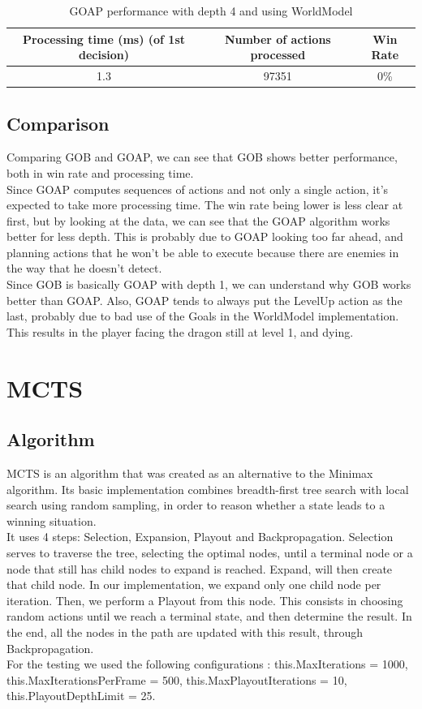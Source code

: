 \documentclass{article}
\begin{document}
  \begin{table}[h!]
    \centering
    \caption{GOAP performance with depth 4 and using WorldModel}
    \label{tab:tableGOAP6}
    \begin{tabular}{c|c|c}
      \textbf{Processing time (ms) (of 1st decision)} & \textbf{Number of actions processed} & \textbf{Win Rate}\\
      \hline
      1.3 & 97351 & 0\%
    \end{tabular}
  \end{table}
  \subsection{Comparison}
  Comparing GOB and GOAP, we can see that GOB shows better performance, both in win rate and processing time. \\
  Since GOAP computes sequences of actions and not only a single action, it's expected to take more processing time. The win rate being lower is less clear at first, but
  by looking at the data, we can see that the GOAP algorithm works better for less depth. This is probably due to GOAP looking too far ahead, and planning actions 
  that he won't be able to execute because there are enemies in the way that he doesn't detect. \\
  Since GOB is basically GOAP with depth 1, we can understand why GOB works better than GOAP. Also, GOAP tends to always put the LevelUp action as the last, probably due to
  bad use of the Goals in the WorldModel implementation. This results in the player facing the dragon still at level 1, and dying.
  
  \section{MCTS}
  \subsection{Algorithm}
  MCTS is an algorithm that was created as an alternative to the Minimax algorithm. Its basic implementation combines breadth-first tree search with local search using
  random sampling, in order to reason whether a state leads to a winning situation.\\
  It uses 4 steps: Selection, Expansion, Playout and Backpropagation. Selection serves to traverse the tree, selecting the optimal nodes, until a terminal node or a node that 
  still has child nodes to expand is reached. Expand, will then create that child node. In our implementation, we expand only one child node per iteration. Then, we perform 
  a Playout from this node. This consists in choosing random actions until we reach a terminal state, and then determine the result.
  In the end, all the nodes in the path are updated with this result, through Backpropagation. \\
  For the testing we used the following configurations : this.MaxIterations = 1000, this.MaxIterationsPerFrame = 500, this.MaxPlayoutIterations = 10,
  this.PlayoutDepthLimit = 25.
  
\end{document}
